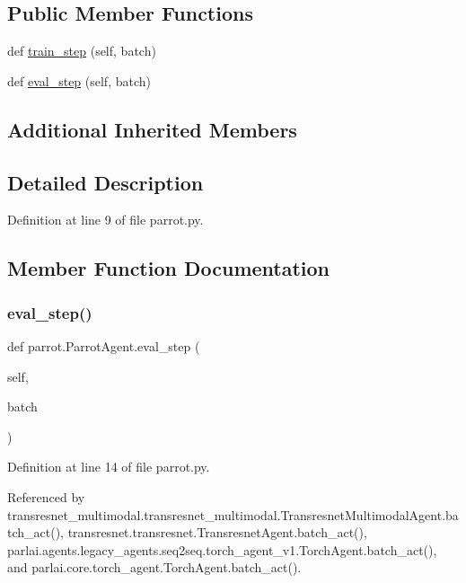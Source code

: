 \subsection*{Public Member Functions}
\begin{DoxyCompactItemize}
\item 
def \hyperlink{classparrot_1_1ParrotAgent_a85446c6c7698b050d80a2324495c9321}{train\+\_\+step} (self, batch)
\item 
def \hyperlink{classparrot_1_1ParrotAgent_a210ad5eb90ce7add4a2b2cb641c4de3c}{eval\+\_\+step} (self, batch)
\end{DoxyCompactItemize}
\subsection*{Additional Inherited Members}


\subsection{Detailed Description}


Definition at line 9 of file parrot.\+py.



\subsection{Member Function Documentation}
\mbox{\label{classparrot_1_1ParrotAgent_a210ad5eb90ce7add4a2b2cb641c4de3c}} 
\subsubsection{\texorpdfstring{eval\+\_\+step()}{eval\_step()}}
{\footnotesize\ttfamily def parrot.\+Parrot\+Agent.\+eval\+\_\+step (\begin{DoxyParamCaption}\item[{}]{self,  }\item[{}]{batch }\end{DoxyParamCaption})}



Definition at line 14 of file parrot.\+py.



Referenced by transresnet\+\_\+multimodal.\+transresnet\+\_\+multimodal.\+Transresnet\+Multimodal\+Agent.\+batch\+\_\+act(), transresnet.\+transresnet.\+Transresnet\+Agent.\+batch\+\_\+act(), parlai.\+agents.\+legacy\+\_\+agents.\+seq2seq.\+torch\+\_\+agent\+\_\+v1.\+Torch\+Agent.\+batch\+\_\+act(), and parlai.\+core.\+torch\+\_\+agent.\+Torch\+Agent.\+batch\+\_\+act().

